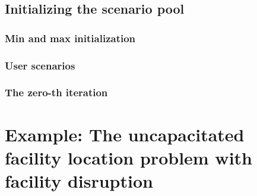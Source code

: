
\subsection{Initializing the scenario pool}
\label{sec:ccg:initial-scenario}

\subsubsection{Min and max initialization}


\subsubsection{User scenarios}


\subsubsection{The zero-th iteration}


\section[Example: The UFLP with facility disruption]{Example: The uncapacitated facility location problem with facility disruption}

